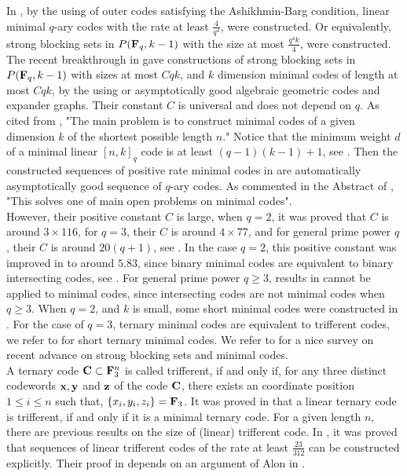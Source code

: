 \documentclass[10pt,a4paper]{article}
\begin{document}
In \cite[Corollary 3.3]{Bartoli}, by the using of outer codes satisfying the Ashikhmin-Barg condition, linear minimal $q$-ary codes with the rate at least $\frac{4}{q^4}$, were constructed. Or equivalently, strong blocking sets in $P({\bf F}_q, k-1)$ with the size at most $\frac{q^4k}{4}$, were constructed. The recent breakthrough in \cite{Alon} gave constructions of strong blocking sets in $P({\bf F}_q,k-1)$ with sizes at most $Cqk$, and $k$ dimension minimal codes of length at most $Cqk$, by the using or asymptotically good algebraic geometric codes and expander graphs. Their constant $C$ is universal and does not depend on $q$. As cited from \cite{Alon}, "The main problem is to construct minimal codes of a given dimension $k$ of the shortest possible length $n$."  Notice that the minimum weight $d$ of a minimal linear $[n,k]_q$ code is at least $(q-1)(k-1)+1$, see \cite{Alfarano}. Then the constructed sequences of positive rate minimal codes in \cite{Alon} are automatically asymptotically good sequence of $q$-ary codes. As commented in the Abstract of \cite{Alon}, "This solves one of main open problems on minimal codes".\\

However, their positive constant $C$ is large, when $q=2$, it was proved that $C$ is around $3 \times 116$, for $q=3$, their $C$ is around $4 \times 77$, and for general prime power $q$, their $C$ is around $20(q+1)$, see
\cite[Table 3]{Alon}. In the case $q=2$, this positive constant was improved in \cite{Borello} to around $5.83$, since binary minimal
 codes are equivalent to binary intersecting codes, see \cite[Table 3]{Borello}. For general prime power $q \geq 3$, results in \cite[Table 3]{Borello} cannot be applied to minimal codes, since intersecting codes are not minimal codes when $q \geq 3$. When $q=2$, and $k$ is small, some short minimal codes were constructed in \cite{Kurz,CZ}. For the case of $q=3$, ternary minimal codes are equivalent to trifferent codes, we refer to \cite{Bishnoi} for short ternary minimal codes. We refer to \cite{Scotti1} for a nice survey on recent advance on strong blocking sets and minimal codes.\\

A ternary code ${\bf C} \subset {\bf F}_3^n$ is called trifferent, if and only if, for any three distinct codewords ${\bf x}, {\bf y} $ and ${\bf z}$ of the code ${\bf C}$, there exists an coordinate position $1\leq i \leq n$ such that, $\{x_i,y_i,z_i\}={\bf F}_3$. It was proved in \cite{Bishnoi} that a linear ternary code is trifferent, if and only if it is a minimal ternary code. For a given length $n$, there are previous results on the size of (linear) trifferent code. In \cite[Theorem 1.7]{Bishnoi}, it was proved that sequences of linear trifferent codes of the rate at least $\frac{23}{312}$ can be constructed explicitly. Their proof in \cite{Bishnoi} depends on an argument of Alon in \cite{Alon1}.\\
\end{document}

